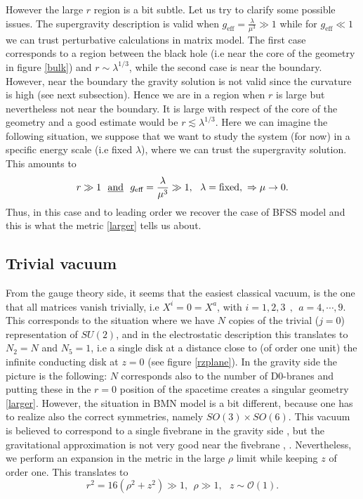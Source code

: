 \documentclass[11pt,english]{article}
\newcommand{\be}{\begin{equation}}
\newcommand{\ee}{\end{equation}}
\numberwithin{equation}{section}
\begin{document}
However the large $r$ region is a bit subtle. Let us try to clarify some possible issues. The supergravity description is valid when $g_{\text{eff}}=\frac{\lambda}{\mu^3}\gg 1$ while for $g_{\text{eff}}\ll 1$ we can trust perturbative calculations in matrix model. The first case corresponds to a region between the black hole (i.e near the core of the geometry in figure \ref{bulk}) and  $r\sim\lambda^{1/3}$, while the second case is near the boundary. However, near the boundary the gravity solution is not valid since the curvature is high (see next subsection).   Hence we are in a region when $r$ is large but nevertheless not near the boundary. It is large with respect of the core of the geometry and a good estimate would be $r\lesssim \lambda^{1/3}$. Here we can imagine the following situation, we suppose that we want to study the system (for now) in a specific energy scale (i.e fixed $\lambda$), where we can trust the supergravity solution. This amounts to 
\be 
r\gg 1~~\text{\underline{and}}~~g_{\text{eff}}=\frac{\lambda}{\mu^3}\gg1,~~\lambda=\text{fixed},~\Rightarrow \mu\to 0.
\ee 
Thus, in this case and to leading order we recover the case of BFSS model and this is what the metric \eqref{larger} tells us about.

 
\subsection{Trivial vacuum}
From the gauge theory side, it seems that the easiest classical vacuum, is the one that all matrices vanish trivially, i.e $X^i=0=X^a$, with $ i=1,2,3~~,~~a=4,\cdots,9$. This corresponds to the situation where we have  $N$ copies of the trivial ($j=0$) representation of $SU(2)$, and in the electrostatic description this translates to $N_2=N$ and $N_5=1$, i.e a single disk at a distance close to (of order one unit) the infinite conducting disk at $z=0$ (see figure \ref{rzplane}). In the gravity side the picture is the following: $N$ corresponds also to the number of D0-branes  and putting these in the $r=0$ position of the spacetime creates a singular geometry  \eqref{larger}. However, the situation in BMN model is a bit different, because one has to realize also the correct symmetries, namely $SO(3)\times SO(6)$. This vacuum is believed to correspond to a single fivebrane in the gravity side \cite{Maldacena2003}, but the gravitational approximation is not very good near the fivebrane  \cite{Berenstein2002}, \cite{Lin2006}. Nevertheless, we perform an expansion in the metric in the large $\rho$ limit while keeping $z$ of order one. This translates to 
\be 
r^2=16\left(\rho^2+z^2\right)\gg1,~~\rho\gg1,~~~z\sim\mathcal{O}(1).
\ee 
\end{document}
